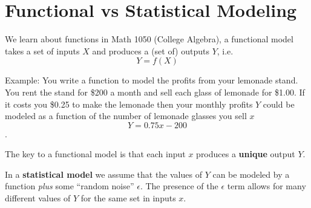 \documentclass[12pt]{notes}
\begin{document}

\begin{minipage}[l][3cm][c]{\textwidth}
\end{minipage}


\section{Functional vs Statistical Modeling}

We learn about functions in Math 1050 (College Algebra), a functional model takes a set of inputs $X$ and produces a (set of) outputs $Y$, i.e.
\[Y = f(X)\]

Example: 
You write a function to model the profits from your lemonade stand. You rent the stand for \$200 a month and sell each glass of lemonade for \$1.00. If it costs you \$0.25 to make the lemonade then your monthly profits $Y$ could be modeled as a function of the number of lemonade glasses you sell $x$
\[Y = 0.75x - 200\]. 

The key to a functional model is that each input $x$ produces a \textbf{unique} output $Y$.

\vspace{0.5cm}
In a \textbf{statistical model} we assume that the values of $Y$ can be modeled by a function \textit{plus} some ``random noise'' $\epsilon$. The presence of the $\epsilon$ term allows for many different values of $Y$ for the same set in inputs $x$. 
\end{document}

